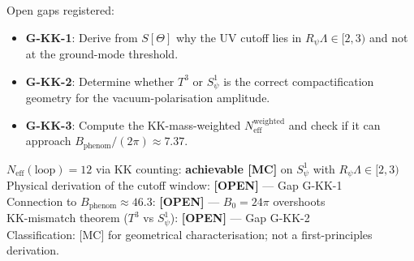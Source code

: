 \documentclass[12pt,a4paper]{article}
\newcommand{\Neff}{N_{\mathrm{eff}}}
\begin{document}
Open gaps registered:
\begin{itemize}
  \item \textbf{G-KK-1}: Derive from $S[\Theta]$ why the UV cutoff lies in
        $R_\psi\Lambda \in [2,3)$ and not at the ground-mode threshold.
  \item \textbf{G-KK-2}: Determine whether $T^3$ or $S^1_\psi$ is the correct
        compactification geometry for the vacuum-polarisation amplitude.
  \item \textbf{G-KK-3}: Compute the KK-mass-weighted $\Neff^{\mathrm{weighted}}$
        and check if it can approach $B_{\mathrm{phenom}}/(2\pi) \approx 7.37$.
\end{itemize}

\begin{statusbox}
$\Neff(\mathrm{loop}) = 12$ via KK counting: \textbf{achievable [MC]} on $S^1_\psi$
with $R_\psi\Lambda \in [2,3)$\\
Physical derivation of the cutoff window: \textbf{[OPEN]} — Gap G-KK-1\\
Connection to $B_{\mathrm{phenom}} \approx 46.3$: \textbf{[OPEN]} — $B_0 = 24\pi$ overshoots\\
KK-mismatch theorem ($T^3$ vs $S^1_\psi$): \textbf{[OPEN]} — Gap G-KK-2\\
Classification: [MC] for geometrical characterisation; not a first-principles derivation.
\end{statusbox}

\ifdefined\INCLUDEMODE
\else
  
\end{document}
